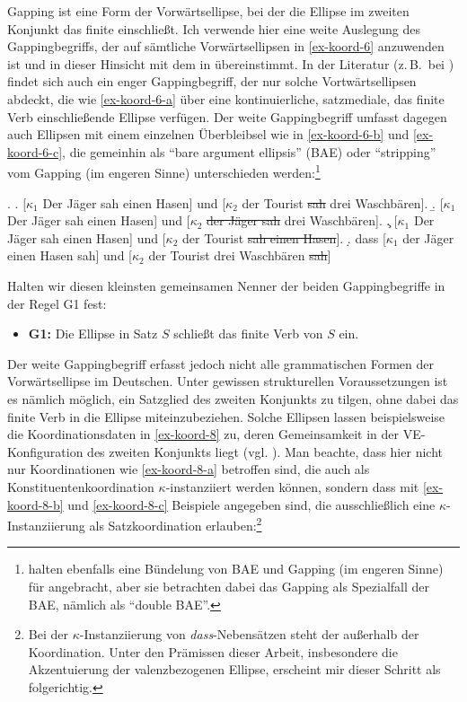 Gapping ist eine Form der Vorwärtsellipse, bei der die Ellipse im zweiten Konjunkt das finite  einschlie\ss t. Ich verwende hier eine weite Auslegung des Gappingbegriffs, der auf sämtliche Vorwärtsellipsen in \ref{ex-koord-6} anzuwenden ist und in dieser Hinsicht mit dem in \citet[144]{Hartmann:00} übereinstimmt.  In der Literatur (z.\,B.\  bei \citealt{Ross:70,Jackendoff:71}) findet sich auch ein enger Gappingbegriff, der nur solche Vortwärtsellipsen abdeckt, die wie \ref{ex-koord-6-a} über eine kontinuierliche, satzmediale, das finite Verb einschlie\ss ende Ellipse verfügen. Der weite Gappingbegriff umfasst dagegen auch Ellipsen mit einem einzelnen Überbleibsel wie in \ref{ex-koord-6-b} und \ref{ex-koord-6-c}, die gemeinhin als "`bare argument ellipsis"' (BAE) oder "`stripping"' vom Gapping (im engeren Sinne) unterschieden werden:\footnote{\citet[275f]{Culicover:Jackendoff:05} halten ebenfalls eine Bündelung von BAE und Gapping (im engeren Sinne) für angebracht, aber sie betrachten dabei das Gapping als Spezialfall der BAE, nämlich als "`double BAE"'.}  

\ex. \label{ex-koord-6}
\a. \label{ex-koord-6-a}[$\kappa_1$ Der Jäger sah einen Hasen] und [$\kappa_2$ der Tourist \sout{sah} drei Waschbären].
\b. \label{ex-koord-6-b}[$\kappa_1$ Der Jäger sah einen Hasen] und [$\kappa_2$ \sout{der Jäger sah} drei Waschbären].
\c. \label{ex-koord-6-c}[$\kappa_1$ Der Jäger sah einen Hasen] und [$\kappa_2$ der Tourist \sout{sah einen Hasen}].
\d. \label{ex-koord-6-c} dass [$\kappa_1$ der Jäger einen Hasen sah] und [$\kappa_2$ der Tourist drei Waschbären \sout{sah}]

Halten wir diesen kleinsten gemeinsamen Nenner der beiden Gappingbegriffe in der Regel G1 fest:
\begin{itemize}
  \item[] {\bf G1:} Die Ellipse in Satz $S$ schlie\ss t das finite Verb von $S$ ein.
\end{itemize}
Der weite Gappingbegriff erfasst jedoch nicht alle grammatischen Formen der Vorwärtsellipse im Deutschen. Unter gewissen strukturellen Voraussetzungen ist es nämlich möglich, ein Satzglied des zweiten Konjunkts zu tilgen, ohne dabei das finite Verb in die Ellipse miteinzubeziehen. Solche Ellipsen lassen beispielsweise die Koordinationsdaten in \ref{ex-koord-8} zu, deren Gemeinsamkeit in der VE-Konfiguration des zweiten Konjunkts liegt (vgl. \citealt{Wilder:94,Wilder:97}). Man beachte, dass hier nicht nur Koordinationen wie \ref{ex-koord-8-a} betroffen sind, die auch als Konstituentenkoordination $\kappa$-instanziiert werden können, sondern dass mit \ref{ex-koord-8-b} und \ref{ex-koord-8-c} Beispiele angegeben sind, die ausschlie\ss lich eine $\kappa$-Instanziierung als Satzkoordination erlauben:\footnote{Bei der $\kappa$-Instanziierung von \emph{dass}-Nebensätzen steht der  au\ss erhalb der Koordination. Unter den Prämissen dieser Arbeit, insbesondere die Akzentuierung der valenzbezogenen Ellipse, erscheint mir dieser Schritt als folgerichtig.} 

